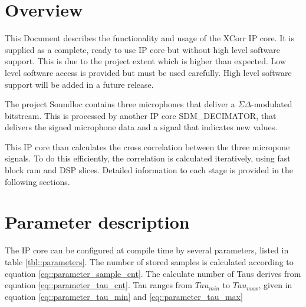 


\maketitle


\section{Overview}
\label{sec:overview}

This Document describes the functionality and usage of the XCorr IP core.
It is supplied as a complete, ready to use IP core but without high level software support.
This is due to the project extent which is higher than expected.
Low level software access is provided but must be used carefully.
High level software support will be added in a future release.

The project Soundloc contains three microphones that deliver a $\Sigma\Delta$-modulated bitstream.
This is processed by another IP core SDM\_DECIMATOR, that delivers the signed microphone data and a signal that indicates new values.

This IP core than calculates the cross correlation between the three micropone signals.
To do this efficiently, the correlation is calculated iteratively, using fast block ram and DSP slices.
Detailed information to each stage is provided in the following sections.

\section{Parameter description}
\label{sec::parameters}

The IP core can be configured at compile time by several parameters, listed in table \ref{tbl::parameters}.
The number of stored samples is calculated according to equation \ref{eq::parameter_sample_cnt}.
The calculate number of Taus derives from equation \ref{eq::parameter_tau_cnt}.
Tau ranges from $Tau_{min}$ to $Tau_{max}$, given in equation \ref{eq::parameter_tau_min} and \ref{eq::parameter_tau_max}

